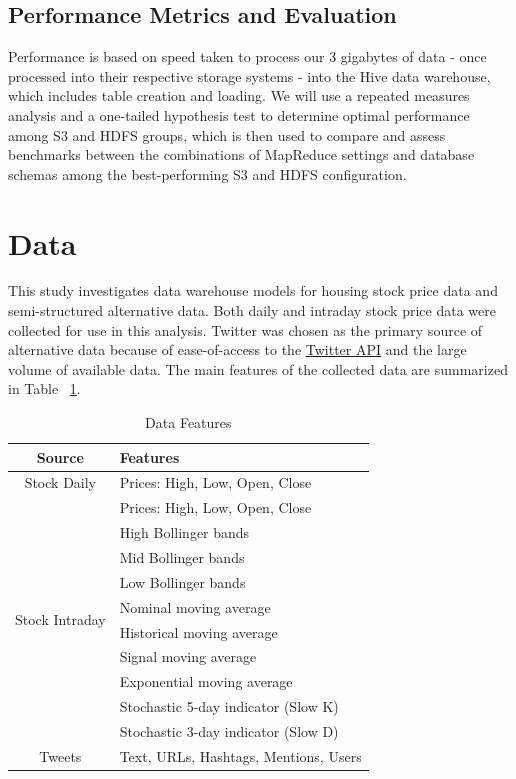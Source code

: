 \documentclass[journal]{IEEEtran}
\begin{document}
\subsection{Performance Metrics and Evaluation}

Performance is based on speed taken to process our 3 gigabytes of data 
 - once processed into their respective storage systems - 
 into the Hive data warehouse, which includes table creation and loading. 
We will use a repeated measures analysis and a one-tailed hypothesis 
 test to determine optimal performance among S3 and HDFS groups, 
 which is then used to compare and assess benchmarks between the 
 combinations of MapReduce settings and database schemas among the
 best-performing S3 and HDFS configuration.




\section{Data}

This study investigates data warehouse models for housing stock
 price data and semi-structured alternative data. 
Both daily and intraday stock price data were collected
 for use in this analysis. 
Twitter was chosen as the primary source of alternative data because of
 ease-of-access to the \href{https://developer.twitter.com/en/docs}{Twitter API} 
 and the large volume of available data.
The main features of the collected data are summarized in Table ~\ref{DataFeatures}.

\begin{table}
	\renewcommand{\arraystretch}{1.3}
	\caption{Data Features}
	\label{DataFeatures}
	\centering
	\begin{tabular}{c|l}
		\hline
		Source       & Features\\
		\hline
		\hline
		Stock Daily  & Prices: High, Low, Open, Close\\
		\hline
		\multirow{10}{*}{Stock Intraday} &  Prices: High, Low, Open, Close \\
		&  High Bollinger bands\\
		&  Mid Bollinger bands\\
		&  Low Bollinger bands\\ 
		&  Nominal moving average\\
		&  Historical moving average\\
		&  Signal moving average\\ 
		&  Exponential moving average\\
		&  Stochastic 5-day indicator (Slow K)\\
		&  Stochastic 3-day indicator (Slow D)\\
		\hline
		Tweets       & Text, URLs, Hashtags, Mentions, Users\\
		\hline
	\end{tabular}
\end{table}
\end{document}
